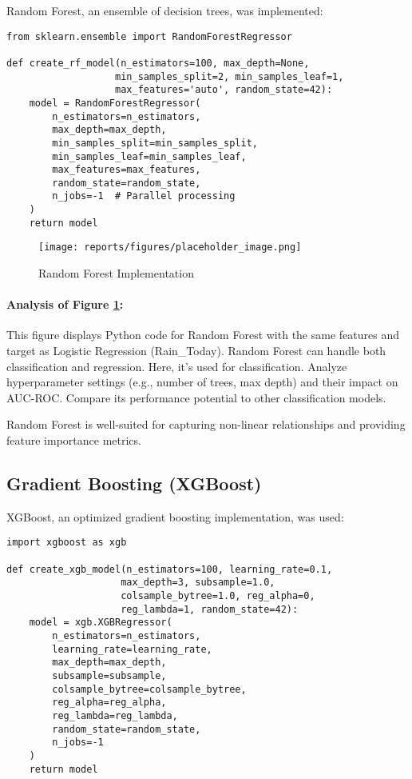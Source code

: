 \documentclass[12pt]{article}
\begin{document}
Random Forest, an ensemble of decision trees, was implemented:

\begin{verbatim}
from sklearn.ensemble import RandomForestRegressor

def create_rf_model(n_estimators=100, max_depth=None, 
                   min_samples_split=2, min_samples_leaf=1,
                   max_features='auto', random_state=42):
    model = RandomForestRegressor(
        n_estimators=n_estimators,
        max_depth=max_depth,
        min_samples_split=min_samples_split,
        min_samples_leaf=min_samples_leaf,
        max_features=max_features,
        random_state=random_state,
        n_jobs=-1  # Parallel processing
    )
    return model
\end{verbatim}

\begin{figure}[H]
    \centering
    \texttt{[image: reports/figures/placeholder\_image.png]} %
    \caption{Random Forest Implementation}
    \label{fig:3_3_rf_implementation}
\end{figure}

\paragraph{Analysis of Figure \ref{fig:3_3_rf_implementation}:}
This figure displays Python code for Random Forest with the same features and target as Logistic Regression (Rain\_Today). Random Forest can handle both classification and regression. Here, it’s used for classification. Analyze hyperparameter settings (e.g., number of trees, max depth) and their impact on AUC-ROC. Compare its performance potential to other classification models.

Random Forest is well-suited for capturing non-linear relationships and providing feature importance metrics.

\subsection{Gradient Boosting (XGBoost)}
\label{subsec:xgboost}

XGBoost, an optimized gradient boosting implementation, was used:

\begin{verbatim}
import xgboost as xgb

def create_xgb_model(n_estimators=100, learning_rate=0.1, 
                    max_depth=3, subsample=1.0, 
                    colsample_bytree=1.0, reg_alpha=0,
                    reg_lambda=1, random_state=42):
    model = xgb.XGBRegressor(
        n_estimators=n_estimators,
        learning_rate=learning_rate,
        max_depth=max_depth,
        subsample=subsample,
        colsample_bytree=colsample_bytree,
        reg_alpha=reg_alpha,
        reg_lambda=reg_lambda,
        random_state=random_state,
        n_jobs=-1
    )
    return model
\end{verbatim}
\end{document}
